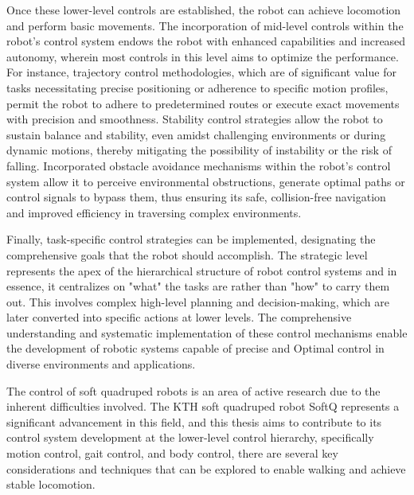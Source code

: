 Once these lower-level controls are established, the robot can achieve locomotion and perform basic movements. The incorporation of mid-level controls within the robot's control system endows the robot with enhanced capabilities and increased autonomy\cite{choi2023Learning}, wherein most controls in this level aims to optimize the performance. For instance, trajectory control methodologies\cite{lee2017Trajectory}, which are of significant value for tasks necessitating precise positioning or adherence to specific motion profiles, permit the robot to adhere to predetermined routes or execute exact movements with precision and smoothness. Stability control strategies allow the robot to sustain balance and stability\cite{sun2022Balance}, even amidst challenging environments or during dynamic motions, thereby mitigating the possibility of instability or the risk of falling. Incorporated obstacle avoidance mechanisms within the robot's control system allow it to perceive environmental obstructions\cite{li2022Quadruped}, generate optimal paths or control signals to bypass them, thus ensuring its safe, collision-free navigation and improved efficiency in traversing complex environments. 

Finally, task-specific control strategies can be implemented, designating the comprehensive goals that the robot should accomplish. The strategic level represents the apex of the hierarchical structure of robot control systems and in essence, it centralizes on "what" the tasks are rather than "how" to carry them out. This involves complex high-level planning and decision-making\cite{miki2022Learning}, which are later converted into specific actions at lower levels. The comprehensive understanding and systematic implementation of these control mechanisms enable the development of robotic systems capable of precise and Optimal control in diverse environments and applications. 


The control of soft quadruped robots is an area of active research due to the inherent difficulties involved. The KTH soft quadruped robot SoftQ represents a significant advancement in this field, and this thesis aims to contribute to its control system development at the lower-level control hierarchy, specifically motion control, gait control, and body control, there are several key considerations and techniques that can be explored to enable walking and achieve stable locomotion. 

